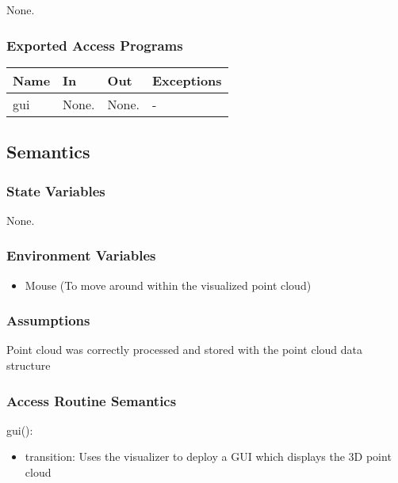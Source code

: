 \documentclass[12pt, titlepage]{article}
\begin{document}
None.

\subsubsection{Exported Access Programs}

\begin{center}
\begin{tabular}{p{2cm} p{4cm} p{4cm} p{2cm}}
\hline
\textbf{Name} & \textbf{In} & \textbf{Out} & \textbf{Exceptions} \\
\hline
gui & None. & None. & - \\
\hline
\end{tabular}
\end{center}

\subsection{Semantics}

\subsubsection{State Variables}

None.

\subsubsection{Environment Variables}

\begin{itemize}
  \item Mouse (To move around within the visualized point cloud)
\end{itemize}

\subsubsection{Assumptions}

Point cloud was correctly processed and stored with the point cloud data structure


\subsubsection{Access Routine Semantics}

\noindent gui():
\begin{itemize}
\item transition: Uses the visualizer to deploy a GUI which displays the 3D point cloud
\end{itemize}
\end{document}
